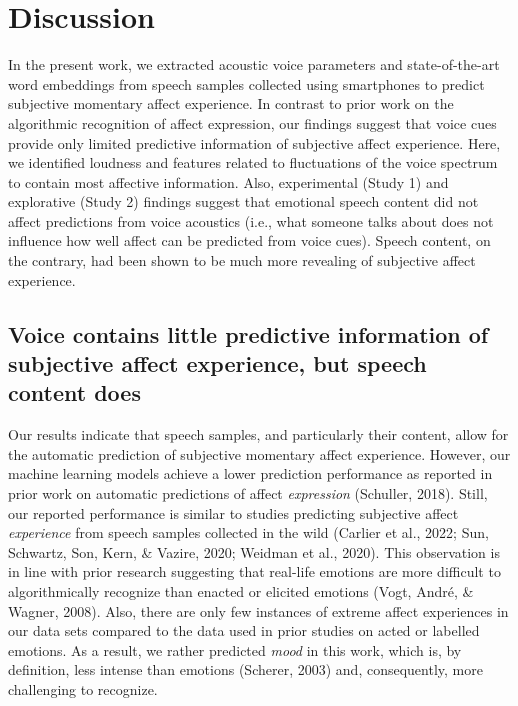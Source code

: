 \documentclass[
  english,
  man,floatsintext]{apa6}
\begin{document}
\newpage

\hypertarget{discussion}{%
\section{Discussion}\label{discussion}}

In the present work, we extracted acoustic voice parameters and state-of-the-art word embeddings from speech samples collected using smartphones to predict subjective momentary affect experience. In contrast to prior work on the algorithmic recognition of affect expression, our findings suggest that voice cues provide only limited predictive information of subjective affect experience. Here, we identified loudness and features related to fluctuations of the voice spectrum to contain most affective information. Also, experimental (Study 1) and explorative (Study 2) findings suggest that emotional speech content did not affect predictions from voice acoustics (i.e., what someone talks about does not influence how well affect can be predicted from voice cues). Speech content, on the contrary, had been shown to be much more revealing of subjective affect experience.

\hypertarget{voice-contains-little-predictive-information-of-subjective-affect-experience-but-speech-content-does}{%
\subsection{Voice contains little predictive information of subjective affect experience, but speech content does}\label{voice-contains-little-predictive-information-of-subjective-affect-experience-but-speech-content-does}}

Our results indicate that speech samples, and particularly their content, allow for the automatic prediction of subjective momentary affect experience. However, our machine learning models achieve a lower prediction performance as reported in prior work on automatic predictions of affect \emph{expression} (Schuller, 2018). Still, our reported performance is similar to studies predicting subjective affect \emph{experience} from speech samples collected in the wild (Carlier et al., 2022; Sun, Schwartz, Son, Kern, \& Vazire, 2020; Weidman et al., 2020). This observation is in line with prior research suggesting that real-life emotions are more difficult to algorithmically recognize than enacted or elicited emotions (Vogt, André, \& Wagner, 2008). Also, there are only few instances of extreme affect experiences in our data sets compared to the data used in prior studies on acted or labelled emotions. As a result, we rather predicted \emph{mood} in this work, which is, by definition, less intense than emotions (Scherer, 2003) and, consequently, more challenging to recognize.
\end{document}
